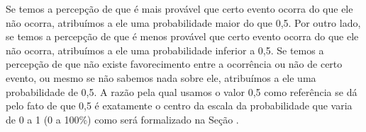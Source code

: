 Se temos a percepção de que é mais provável que certo evento ocorra do que ele não ocorra, atribuímos a ele uma probabilidade maior do que 0,5. Por outro lado, se temos a percepção de que é menos provável que certo evento ocorra do que ele não ocorra, atribuímos a ele uma probabilidade inferior a 0,5. Se temos a percepção de que não existe favorecimento entre a ocorrência ou não de certo evento, ou mesmo se não sabemos nada sobre ele, atribuímos a ele uma probabilidade de 0,5. A razão pela qual usamos o valor 0,5 como referência se dá pelo fato de que 0,5 é exatamente o centro da escala da probabilidade que varia de 0 a 1 (0 a 100\%) como será formalizado na Seção {\hyperref[\detokenize{PE511-4:sec-organizando-propriedades}]{}}.


